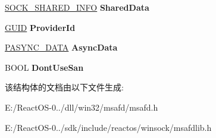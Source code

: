 \begin{DoxyCompactItemize}
\begin{tabbing}
\end{tabbing}\item 
\mbox{\label{struct___s_o_c_k_e_t___i_n_f_o_r_m_a_t_i_o_n_a10c90521f426ebf6bafdbff82a1cbd7a}} 
\hyperlink{struct___s_o_c_k___s_h_a_r_e_d___i_n_f_o}{S\+O\+C\+K\+\_\+\+S\+H\+A\+R\+E\+D\+\_\+\+I\+N\+FO} {\bfseries Shared\+Data}
\item 
\mbox{\label{struct___s_o_c_k_e_t___i_n_f_o_r_m_a_t_i_o_n_a7c2751072de0cb2792f439f46e8b44bb}} 
\hyperlink{interface_g_u_i_d}{G\+U\+ID} {\bfseries Provider\+Id}
\item 
\mbox{\label{struct___s_o_c_k_e_t___i_n_f_o_r_m_a_t_i_o_n_a0930be66d2b5dd278ecd323b4b7e7c7f}} 
\hyperlink{struct___a_s_y_n_c___d_a_t_a}{P\+A\+S\+Y\+N\+C\+\_\+\+D\+A\+TA} {\bfseries Async\+Data}
\item 
\mbox{\label{struct___s_o_c_k_e_t___i_n_f_o_r_m_a_t_i_o_n_a95d5614fa321de1d2a887c86233373d6}} 
B\+O\+OL {\bfseries Dont\+Use\+San}
\end{DoxyCompactItemize}


该结构体的文档由以下文件生成\+:\begin{DoxyCompactItemize}
\item 
E\+:/\+React\+O\+S-\/0../dll/win32/msafd/msafd.\+h\item 
E\+:/\+React\+O\+S-\/0../sdk/include/reactos/winsock/msafdlib.\+h\end{DoxyCompactItemize}
